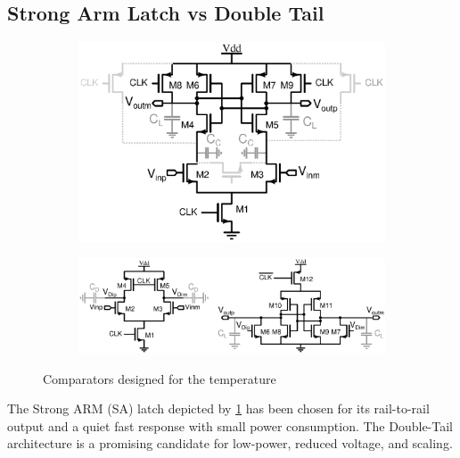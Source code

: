     \subsection{Strong Arm Latch vs Double Tail} %
\begin{figure}[htp]
    \centering
    \begin{subfigure}[b]{0.36\textwidth}
        \centering
        \includegraphics[width=\textwidth]{Chapter7/Figs/sa_designed.eps}
        \label{fig:sa_designed}
    \end{subfigure}
    \begin{subfigure}[b]{0.62\textwidth}
        \centering
        \includegraphics[width=\textwidth]{Chapter7/Figs/dtl_designed.eps}
        \label{fig:dtl_designed}
    \end{subfigure}
    \caption{Comparators designed for the temperature}
    \label{fig:cmp_designed}
\end{figure}

The Strong ARM (SA) latch depicted by \figurename\ref{fig:sa_designed} has been chosen for its rail-to-rail output and a quiet fast response with small power consumption. The Double-Tail architecture is a promising candidate for low-power, reduced voltage, and scaling. 
